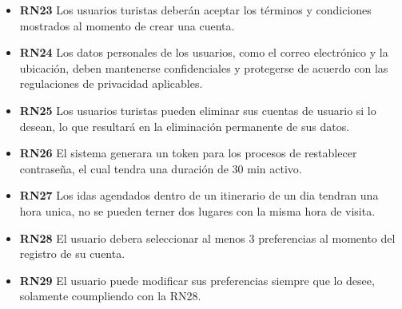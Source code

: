 \documentclass{article}
\begin{document}
    \begin{itemize}
        \item \textbf{RN23} Los usuarios turistas deberán aceptar los términos y condiciones mostrados al momento de crear una cuenta.
        \item \textbf{RN24} Los datos personales de los usuarios, como el correo electrónico y la ubicación, deben mantenerse confidenciales y protegerse de acuerdo con las regulaciones de privacidad aplicables.
    \end{itemize}
    

    \begin{itemize}
        \item \textbf{RN25} Los usuarios turistas pueden eliminar sus cuentas de usuario si lo desean, lo que resultará en la eliminación permanente de sus datos.
    \end{itemize}
    \begin{itemize}
        \item \textbf{RN26} El sistema generara un token para los procesos de restablecer contraseña, el cual tendra una duración de 30 min activo.
        \item \textbf{RN27} Los idas agendados dentro de un itinerario de un dia tendran una hora unica, no se pueden terner dos lugares con la misma hora de visita.
        \item \textbf{RN28} El usuario debera seleccionar al menos 3 preferencias al momento del registro de su cuenta.
        \item \textbf{RN29} El usuario puede modificar sus preferencias siempre que lo desee, solamente coumpliendo con la RN28.
        
        \end{itemize}
    


\newpage
\end{document}
